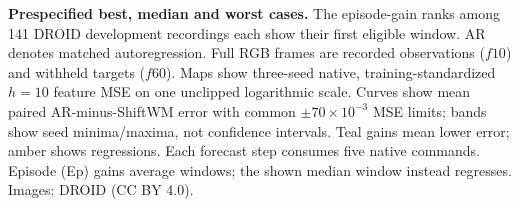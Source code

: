 \textbf{Prespecified best, median and worst cases.} The episode-gain ranks among 141 DROID development recordings each show their first eligible window. AR denotes matched autoregression. Full RGB frames are recorded observations ($f10$) and withheld targets ($f60$). Maps show three-seed native, training-standardized $h=10$ feature MSE on one unclipped logarithmic scale. Curves show mean paired AR-minus-ShiftWM error with common $\pm70\times10^{-3}$ MSE limits; bands show seed minima/maxima, not confidence intervals. Teal gains mean lower error; amber shows regressions. Each forecast step consumes five native commands. Episode (Ep) gains average windows; the shown median window instead regresses. Images: DROID (CC BY 4.0).
